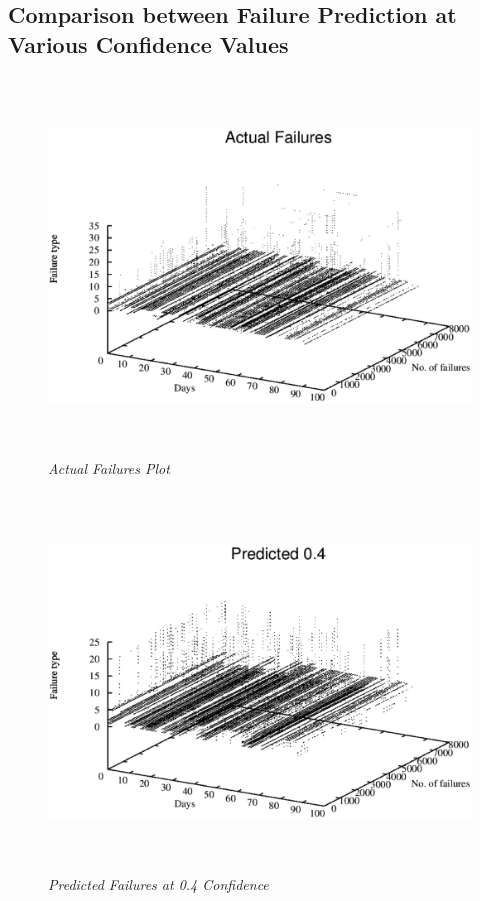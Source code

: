 \pagebreak

\subsection{Comparison between Failure Prediction at Various Confidence Values}
\begin{figure}[h]
		\begin{center}
			\includegraphics[width=15cm,height=10cm]{figures/actualfailures.eps} 
			\caption{\small \sl Actual Failures Plot\label{fig:Label7}} 
		\end{center} 
	\end{figure}

\newpage

\begin{figure}[h]
		\begin{center}
			\includegraphics[width=15cm,height=10cm]{figures/predicted0.4.eps} 
			\caption{\small \sl Predicted Failures at 0.4 Confidence\label{fig:Label7}} 
		\end{center} 
	\end{figure}

